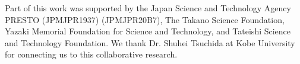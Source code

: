 \documentclass[sigconf]{acmart}
\begin{document}
\begin{acks}
 Part of this work was supported by the Japan Science and Technology Agency PRESTO (JPMJPR1937) (JPMJPR20B7), The Takano Science Foundation, Yazaki Memorial Foundation for Science and Technology, and Tateishi Science and Technology Foundation. We thank Dr. Shuhei Tsuchida at Kobe University for connecting us to this collaborative research.
\end{acks}








\end{document}
